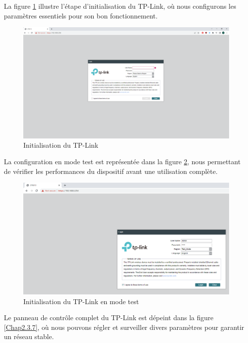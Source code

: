 La figure \ref{Chap2.3.5} illustre l'étape d'initialisation du TP-Link, où nous configurons  les paramètres essentiels pour son bon fonctionnement.

\begin{figure}[H]
\centering
\includegraphics[width=15cm]{Images/tplink3.png}
\caption{Initialisation du TP-Link}
\label{Chap2.3.5}
\end{figure}

La configuration en mode test est représentée dans la figure \ref{Chap2.3.6}, nous permettant de vérifier les performances du dispositif avant une utilisation complète.

\begin{figure}[H]
\centering
\includegraphics[width=15cm]{Images/tplink33.png}
\caption{Initialisation du TP-Link en mode test}
\label{Chap2.3.6}
\end{figure}

Le panneau de contrôle complet du TP-Link est dépeint dans la figure \ref{Chap2.3.7}, où nous pouvons régler et surveiller divers paramètres pour garantir un réseau stable.

